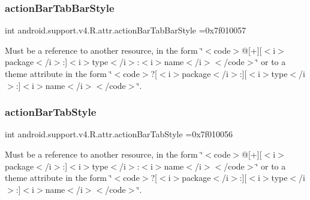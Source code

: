 \subsubsection{\texorpdfstring{action\+Bar\+Tab\+Bar\+Style}{actionBarTabBarStyle}}
{\footnotesize\ttfamily int android.\+support.\+v4.\+R.\+attr.\+action\+Bar\+Tab\+Bar\+Style =0x7f010057\hspace{0.3cm}{\ttfamily [static]}}

Must be a reference to another resource, in the form \char`\"{}$<$code$>$@\mbox{[}+\mbox{]}\mbox{[}$<$i$>$package$<$/i$>$\+:\mbox{]}$<$i$>$type$<$/i$>$\+:$<$i$>$name$<$/i$>$$<$/code$>$\char`\"{} or to a theme attribute in the form \char`\"{}$<$code$>$?\mbox{[}$<$i$>$package$<$/i$>$\+:\mbox{]}\mbox{[}$<$i$>$type$<$/i$>$\+:\mbox{]}$<$i$>$name$<$/i$>$$<$/code$>$\char`\"{}. \mbox{\label{classandroid_1_1support_1_1v4_1_1R_1_1attr_aa87769ae4e0a2ee72da926a6cd712b3e}} 
\subsubsection{\texorpdfstring{action\+Bar\+Tab\+Style}{actionBarTabStyle}}
{\footnotesize\ttfamily int android.\+support.\+v4.\+R.\+attr.\+action\+Bar\+Tab\+Style =0x7f010056\hspace{0.3cm}{\ttfamily [static]}}

Must be a reference to another resource, in the form \char`\"{}$<$code$>$@\mbox{[}+\mbox{]}\mbox{[}$<$i$>$package$<$/i$>$\+:\mbox{]}$<$i$>$type$<$/i$>$\+:$<$i$>$name$<$/i$>$$<$/code$>$\char`\"{} or to a theme attribute in the form \char`\"{}$<$code$>$?\mbox{[}$<$i$>$package$<$/i$>$\+:\mbox{]}\mbox{[}$<$i$>$type$<$/i$>$\+:\mbox{]}$<$i$>$name$<$/i$>$$<$/code$>$\char`\"{}. \mbox{\label{classandroid_1_1support_1_1v4_1_1R_1_1attr_a75300bda33f07c53e6884aa5ba0c739e}} 

